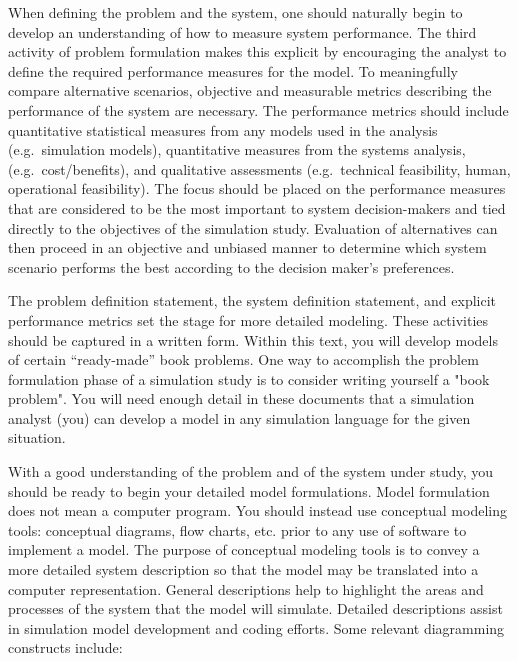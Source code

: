 \documentclass[
]{book}
\theoremstyle{definition}
\theoremstyle{definition}
\theoremstyle{definition}
\theoremstyle{definition}
\theoremstyle{remark}
\begin{document}
When defining the problem and the system, one should naturally begin to
develop an understanding of how to measure system performance. The third
activity of problem formulation makes this explicit by encouraging the
analyst to define the required performance measures for the model. To
meaningfully compare alternative scenarios, objective and measurable
metrics describing the performance of the system are necessary. The
performance metrics should include quantitative statistical measures
from any models used in the analysis (e.g.~simulation models),
quantitative measures from the systems analysis, (e.g.~cost/benefits),
and qualitative assessments (e.g.~technical feasibility, human,
operational feasibility). The focus should be placed on the performance
measures that are considered to be the most important to system
decision-makers and tied directly to the objectives of the simulation
study. Evaluation of alternatives can then proceed in an objective and
unbiased manner to determine which system scenario performs the best
according to the decision maker's preferences.

The problem definition statement, the system definition statement, and
explicit performance metrics set the stage for more detailed modeling.
These activities should be captured in a written form. Within this text,
you will develop models of certain ``ready-made'' book problems. One way
to accomplish the problem formulation phase of a simulation study is to
consider writing yourself a "book problem". You will need enough
detail in these documents that a simulation analyst (you) can develop a
model in any simulation language for the given situation.

With a good understanding of the problem and of the system under study,
you should be ready to begin your detailed model formulations. Model
formulation does not mean a computer program. You should instead use
conceptual modeling tools: conceptual diagrams, flow charts, etc. prior
to any use of software to implement a model. The purpose of conceptual
modeling tools is to convey a more detailed system description so that
the model may be translated into a computer representation. General
descriptions help to highlight the areas and processes of the system
that the model will simulate. Detailed descriptions assist in simulation
model development and coding efforts. Some relevant diagramming
constructs include:
\end{document}
